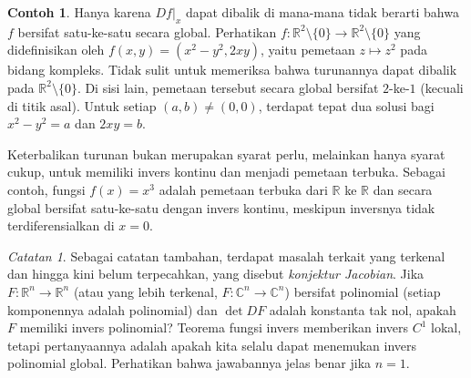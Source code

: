 \documentclass[12pt,openany]{book}
\newcommand{\C}{{\mathbb{C}}}
\newcommand{\R}{{\mathbb{R}}}
\newcommand{\myindex}[1]{#1\index{#1}}
\theoremstyle{plain}
\theoremstyle{remark}
\newtheorem{remark}[thm]{Catatan}
\theoremstyle{definition}
\theoremstyle{exercise}
\theoremstyle{example}
\newtheorem{example}[thm]{Contoh}
\begin{document}
\begin{example}
Hanya karena $Df|_x$ dapat dibalik di mana-mana tidak
berarti bahwa $f$
bersifat satu-ke-satu secara global.
Perhatikan $f \colon \R^2 \setminus \{ 0 \} \to \R^2 \setminus \{ 0 \}$ yang didefinisikan
oleh $f(x,y) = (x^2-y^2,2xy)$, yaitu pemetaan $z \mapsto z^2$ pada
bidang kompleks.  Tidak sulit untuk memeriksa bahwa
turunannya dapat dibalik pada $\R^2 \setminus \{ 0 \}$.
Di sisi lain, pemetaan tersebut secara global bersifat $2$-ke-$1$ (kecuali di titik asal).
Untuk setiap $(a,b) \neq (0,0)$, terdapat tepat dua
solusi bagi $x^2-y^2=a$ dan $2xy=b$.
\end{example}

Keterbalikan turunan bukan merupakan syarat perlu,
melainkan hanya syarat cukup, untuk memiliki invers kontinu dan menjadi pemetaan
terbuka.  Sebagai contoh, fungsi $f(x) = x^3$ adalah pemetaan terbuka dari $\R$
ke $\R$ dan secara global bersifat satu-ke-satu dengan invers kontinu, meskipun
inversnya tidak terdiferensialkan di $x=0$.

\begin{remark}
Sebagai catatan tambahan, terdapat masalah terkait yang terkenal dan hingga kini belum terpecahkan,
yang disebut \emph{\myindex{konjektur Jacobian}}.  Jika $F \colon \R^n \to \R^n$
(atau yang lebih terkenal, $F \colon \C^n \to \C^n$)
bersifat polinomial (setiap komponennya adalah polinomial) dan $\det DF$ adalah konstanta
tak nol, apakah $F$ memiliki invers polinomial?
Teorema fungsi invers memberikan invers $C^1$ lokal, tetapi pertanyaannya adalah apakah kita selalu dapat
menemukan invers polinomial global.
Perhatikan bahwa jawabannya jelas benar jika $n=1$.
\end{remark}
\end{document}
